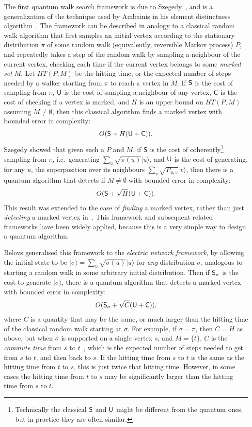 \documentclass{theoretics}
\def\ket#1{{\lvert}#1\rangle}
\renewcommand{\>}{\rangle}
\newcommand{\<}{\langle}
\renewcommand{\(}{\left(}
\renewcommand{\)}{\right)}
\begin{document}
The first quantum walk search framework is due to Szegedy~\cite{szegedy2004QMarkovChainSearch}, and is a generalization of the technique used by Ambainis in his element distinctness algorithm~\cite{ambainis2004QWalkForElementDist}. The framework can be described in analogy to a classical random walk algorithm that first samples an initial vertex according to the stationary distribution $\pi$ of some random walk (equivalently, reversible Markov process) $P$, and repeatedly takes a step of the random walk by sampling a neighbour of the current vertex, checking each time if the current vertex belongs to some \emph{marked set} $M$. Let $HT(P,M)$ be the hitting time, or the expected number of steps needed by a walker starting from $\pi$ to reach a vertex in $M$.
If ${\sf S}$ is the cost of sampling from $\pi$, ${\sf U}$ is the cost of sampling a neighbour of any vertex, ${\sf C}$ is the cost of checking if a vertex is marked, and $H$ is an upper bound on $HT(P,M)$ assuming $M\neq\emptyset$, then this classical algorithm finds a marked vertex with bounded error in complexity:
$$O({\sf S}+H({\sf U}+{\sf C})).$$
Szegedy showed that given such a $P$ and $M$, if ${\sf S}$ is the cost of coherently\footnote{Technically the classical ${\sf S}$ and ${\sf U}$ might be different from the quantum ones, but in practice they are often similar.} sampling from $\pi$, i.e.~generating $\sum_u\sqrt{\pi(u)}\ket{u}$, and ${\sf U}$ is the cost of generating, for any $u$, the superposition over its neighbours $\sum_v\sqrt{P_{u,v}}\ket{v}$, then there is a quantum algorithm that detects if $M\neq \emptyset$ with bounded error in complexity:
$$O({\sf S}+\sqrt{H}({\sf U}+{\sf C})).$$
This result was extended to the case of \emph{finding} a marked vertex, rather than just \emph{detecting} a marked vertex in~\cite{ambainis2019QuadSpeedupFindingMarkedQW}. This framework and subsequent related frameworks have been widely applied, because this is a very simple way to design a quantum algorithm. 

Belovs generalised this framework to the \emph{electric network framework}, by allowing the initial state to be $\ket{\sigma}=\sum_u\sqrt{\sigma(u)}\ket{u}$ for \emph{any} distribution $\sigma$, analogous to starting a random walk in some arbitrary initial distribution. Then if ${\sf S}_\sigma$ is the cost to generate $\ket{\sigma}$, there is a quantum algorithm that detects a marked vertex with bounded error in complexity:
$$O({\sf S}_\sigma+\sqrt{C}({\sf U}+{\sf C})),$$
where $C$ is a quantity that may be the same, or much larger than the hitting time of the classical random walk starting at $\sigma$. For example, if $\sigma=\pi$, then $C=H$ as above, but when $\sigma$ is supported on a single vertex $s$, and $M=\{t\}$, $C$ is the \emph{commute time} from $s$ to $t$~\cite{chandra1996ElectricalResAndCommute}, which is the expected number of steps needed to get from $s$ to $t$, and then back to $s$. If the hitting time from $s$ to $t$ is the same as the hitting time from $t$ to $s$, this is just twice that hitting time. However, in some cases the hitting time from $t$ to $s$ may be significantly larger than the hitting time from $s$ to $t$. 
\end{document}
